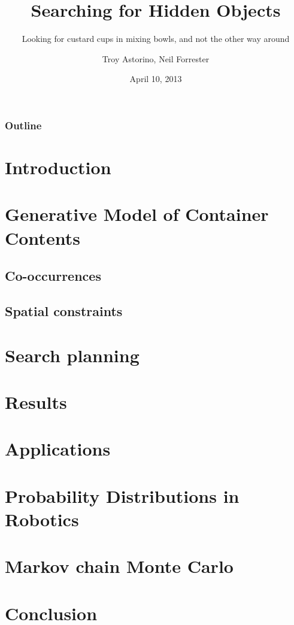 \documentclass{beamer}
\title{Searching for Hidden Objects}
\subtitle{Looking for custard cups in mixing bowls, and not the other way around}
\author{Troy Astorino, Neil Forrester}
\date{April 10, 2013}
\institute[6.834 -- MIT]{Cognitive Robotics \\ Massachusetts Institute of Technology}
\begin{document}
\begin{frame}
  \maketitle
\end{frame}

\begin{frame}
  \frametitle{Outline}
  \tableofcontents
\end{frame}

\section{Introduction}


\section{Generative Model of Container Contents}
\subsection{Co-occurrences}






\subsection{Spatial constraints}


\section{Search planning}


\section{Results}


\section{Applications}


\section{Probability Distributions in Robotics}


\section{Markov chain Monte Carlo}


\section{Conclusion}

\end{document}
